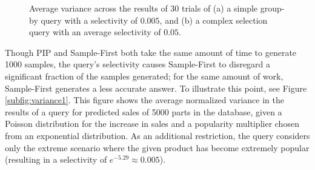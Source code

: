 \begin{figure}
\begin{center}
\caption{Average variance across the results of 30 trials of (a) a simple group-by query with a selectivity of $0.005$, and (b) a complex selection query with an average selectivity of $0.05$.}
\label{fig:variance}
\end{center}
\end{figure}

Though PIP and Sample-First both take the same amount of time to generate 1000 samples, the query's selectivity causes Sample-First to disregard a significant fraction of the samples generated; for the same amount of work, Sample-First generates a less accurate answer.  To illustrate this point, see Figure \ref{subfig:variance1}.  This figure shows the average normalized variance in the results of a query for predicted sales of 5000 parts in the database, given a Poisson distribution for the increase in sales and a popularity multiplier chosen from an exponential distribution.  As an additional restriction, the query considers only the extreme scenario where the given product has become extremely popular (resulting in a selectivity of $e^{-5.29} \approx 0.005$).  


